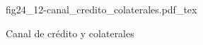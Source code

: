 \begin{figure}[h]
\centering
\def\svgwidth{0.5\textwidth}
{fig24_12-canal_credito_colaterales.pdf_tex}
\caption{Canal de crédito y colaterales}
\label{fig24_12-canal_credito_colaterales}
\end{figure}